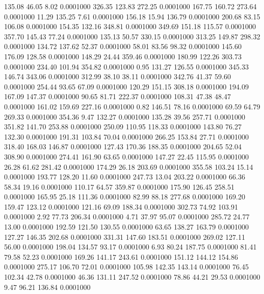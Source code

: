  135.08   46.05    8.02   0.0001000
 326.35  123.83  272.25   0.0001000
 167.75  160.72  273.64   0.0001000
  11.29  135.25    7.61   0.0001000
 156.18   15.94  136.79   0.0001000
 200.68   83.15  106.08   0.0001000
 154.35  132.16  348.81   0.0001000
 349.69  151.18  115.57   0.0001000
 357.70  145.43   77.24   0.0001000
 135.13   50.57  330.15   0.0001000
 313.25  149.87  298.32   0.0001000
 134.72  137.62   52.37   0.0001000
  58.01   83.56   98.32   0.0001000
 145.60  176.09  128.58   0.0001000
 148.29   24.44  359.46   0.0001000
 180.99  122.26  303.73   0.0001000
 234.40  101.94  354.82   0.0001000
   0.95  131.27  126.55   0.0001000
 345.33  146.74  343.06   0.0001000
 312.99   38.10   38.11   0.0001000
 342.76   41.37   59.60   0.0001000
 254.44   93.65   67.09   0.0001000
 120.29  151.15  308.18   0.0001000
 194.09  167.09  147.37   0.0001000
  90.65   81.71  222.37   0.0001000
 108.31   47.38   48.47   0.0001000
 161.02  159.69  227.16   0.0001000
   0.82  146.51   78.16   0.0001000
  69.59   64.79  269.33   0.0001000
 354.36    9.47  132.27   0.0001000
 135.28   39.56  257.71   0.0001000
 351.82  141.70  253.88   0.0001000
 250.09  110.95  118.33   0.0001000
 143.80   76.27  132.30   0.0001000
 191.31  103.84   70.04   0.0001000
 266.25  153.84   27.71   0.0001000
 318.40  168.03  146.87   0.0001000
 127.43  170.36  188.35   0.0001000
 204.65   52.04  308.90   0.0001000
 274.41  161.90   63.65   0.0001000
 147.27   22.45  115.95   0.0001000
  26.28   61.62  281.42   0.0001000
 174.29   26.18  203.69   0.0001000
 355.58  103.24   15.14   0.0001000
 193.77  128.20   11.60   0.0001000
 247.73   13.04  203.22   0.0001000
  66.36   58.34   19.16   0.0001000
 110.17   64.57  359.87   0.0001000
 175.90  126.45  258.51   0.0001000
 165.95   25.18  111.36   0.0001000
  82.99   88.18  277.68   0.0001000
 169.20  159.47  123.12   0.0001000
 121.16   69.09  188.34   0.0001000
 302.73   74.92  103.91   0.0001000
   2.92   77.73  206.34   0.0001000
   4.71   37.97   95.07   0.0001000
 285.72   24.77   13.00   0.0001000
 192.59  121.50  130.55   0.0001000
  63.65  138.27  163.79   0.0001000
 127.27  146.35  202.68   0.0001000
 331.31  147.60  183.51   0.0001000
 269.02  127.11   56.00   0.0001000
 198.04  134.57   93.17   0.0001000
   6.93   80.24  187.75   0.0001000
  81.41   79.58   52.23   0.0001000
 169.26  141.17  243.61   0.0001000
 151.12  144.12  154.86   0.0001000
 275.17  106.70   72.01   0.0001000
 105.98  142.35  143.14   0.0001000
  76.45  102.34   42.78   0.0001000
  46.36  131.11  247.52   0.0001000
  78.86   44.21   29.53   0.0001000
   9.47   96.21  136.84   0.0001000
